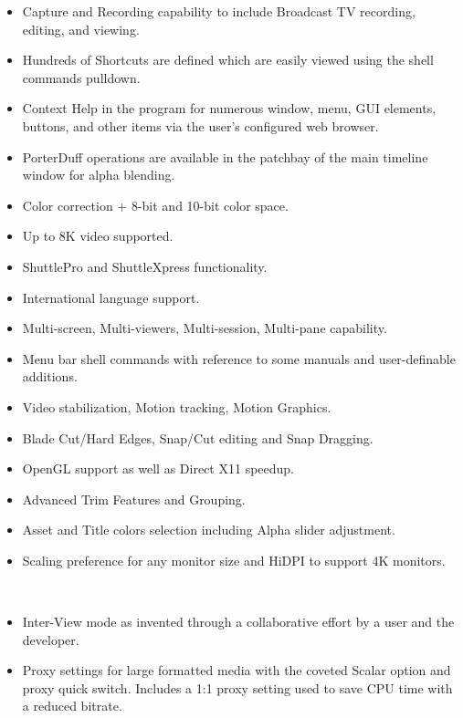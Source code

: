 \begin{description}
\begin{itemize}
                \item Capture and Recording capability to include Broadcast TV recording, editing, and viewing.
                \item Hundreds of Shortcuts are defined which are easily viewed using the shell commands pulldown.
		\item Context Help in the program for numerous window, menu, GUI elements, buttons, and other items via the user's configured web browser.
                \item PorterDuff operations are available in the patchbay of the main timeline window for alpha blending.
                \item Color correction + 8-bit and 10-bit color space.
                \item Up to 8K video supported.
                \item ShuttlePro and ShuttleXpress functionality.
                \item International language support.
                \item Multi-screen, Multi-viewers, Multi-session, Multi-pane capability.
                \item Menu bar shell commands with reference to some manuals and user-definable additions.
                \item Video stabilization, Motion tracking, Motion Graphics.
                \item Blade Cut/Hard Edges, Snap/Cut editing and Snap Dragging.
                \item OpenGL support as well as Direct X11 speedup.
                \item Advanced Trim Features and Grouping.
                \item Asset and Title colors selection including Alpha slider adjustment.
                \item Scaling preference for any monitor size and HiDPI to support 4K monitors.
            \end{itemize}
            \item[Innovative New Features]~\\
                \begin{itemize}
                    \item Inter-View mode as invented through a collaborative effort by a user and the developer.
                    \item Proxy settings for large formatted media with the coveted Scalar option and proxy quick switch.  Includes a 1:1 proxy setting used to save CPU time with a reduced bitrate.

\end{itemize}
\end{description}
